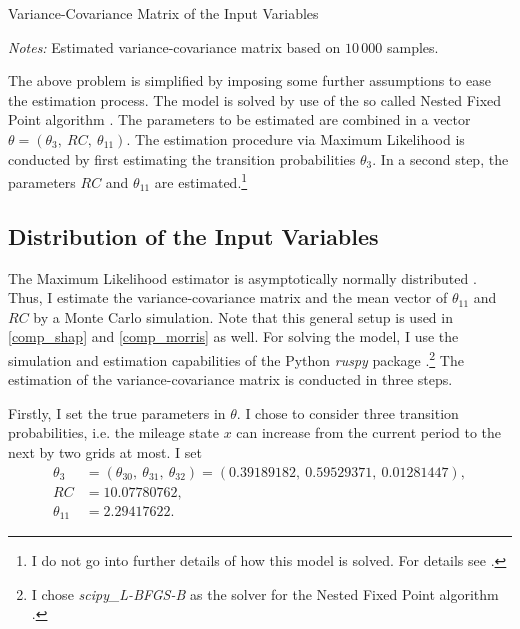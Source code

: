 \begin{table}
	\centering
	\caption{Variance-Covariance Matrix of the Input Variables}
	\label{cov}
	\begin{threeparttable}
	\centering
	
	\begin{tablenotes}
	\small
	\item \textit{Notes:} Estimated variance-covariance matrix based on $10\,000$ samples.
	\end{tablenotes}
	\end{threeparttable}
\end{table}

The above problem is simplified by imposing some further assumptions to ease the estimation process. The model is solved by use of the so called Nested Fixed Point algorithm \citep{R87}. The parameters to be estimated are combined in a vector $\theta=(\theta_3,\ RC,\ \theta_{11}) $. The estimation procedure via Maximum Likelihood is conducted by first estimating the transition probabilities $\theta_3$. In a second step, the parameters $RC$ and $\theta_{11}$ are estimated.\footnote{I do not go into further details of how this model is solved. For details see \citet{R87}.}

\subsection{Distribution of the Input Variables} \label{model_setup}

The Maximum Likelihood estimator is asymptotically normally distributed \citep{R73}. Thus, I estimate the variance-covariance matrix and the mean vector of $\theta_{11}$ and $RC$ by a Monte Carlo simulation. Note that this general setup is used in \cref{comp_shap} and \cref{comp_morris} as well. For solving the model, I use the simulation and estimation capabilities of the Python \textit{ruspy} package \citep{OSE19}.\footnote{I chose \textit{scipy\_L-BFGS-B} as the solver for the Nested Fixed Point algorithm \citep{SP20}.} The estimation of the variance-covariance matrix is conducted in three steps.

Firstly, I set the true parameters in $\theta$. I chose to consider three transition probabilities, i.e. the mileage state $x$ can increase from the current period to the next by two grids at most. I set
\begin{align*}
\theta_3 &= (\theta_{30},\ \theta_{31},\ \theta_{32})=(0.39189182,\ 0.59529371,\ 0.01281447),\\
RC &= 10.07780762,\\
\theta_{11} &= 2.29417622.
\end{align*}

